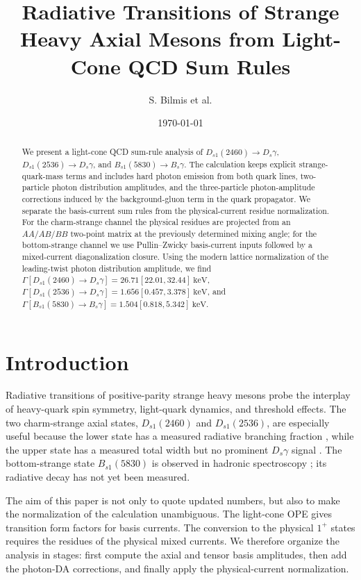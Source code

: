 \documentclass[11pt]{article}
\title{Radiative Transitions of Strange Heavy Axial Mesons from Light-Cone QCD Sum Rules}
\author{S. Bilmis et al.}
\date{\today}
\newcommand{\Ds}{D_s}
\newcommand{\Dsone}{D_{s1}}
\newcommand{\Bs}{B_s}
\newcommand{\Bsone}{B_{s1}}
\newcommand{\keV}{\mathrm{keV}}
\begin{document}
\maketitle

\begin{abstract}
We present a light-cone QCD sum-rule analysis of
$\Dsone(2460)\to\Ds\gamma$, $\Dsone(2536)\to\Ds\gamma$, and
$\Bsone(5830)\to\Bs\gamma$.  The calculation keeps explicit strange-quark-mass
terms and includes hard photon emission from both quark lines, two-particle
photon distribution amplitudes, and the three-particle photon-amplitude
corrections induced by the background-gluon term in the quark propagator.  We
separate the basis-current sum rules from the physical-current residue
normalization.  For the charm-strange channel the physical residues are
projected from an $AA/AB/BB$ two-point matrix at the previously determined
mixing angle; for the bottom-strange channel we use Pullin--Zwicky basis-current
inputs followed by a mixed-current diagonalization closure.  Using the modern
lattice normalization of the
leading-twist photon distribution amplitude, we find
$\Gamma[\Dsone(2460)\to\Ds\gamma]=26.71[22.01,32.44]~\keV$,
$\Gamma[\Dsone(2536)\to\Ds\gamma]=1.656[0.457,3.378]~\keV$, and
$\Gamma[\Bsone(5830)\to\Bs\gamma]=1.504[0.818,5.342]~\keV$.
\end{abstract}

\section{Introduction}

Radiative transitions of positive-parity strange heavy mesons probe the
interplay of heavy-quark spin symmetry, light-quark dynamics, and threshold
effects.  The two charm-strange axial states, $\Dsone(2460)$ and
$\Dsone(2536)$, are especially useful because the lower state has a measured
radiative branching fraction \cite{BaBar2006}, while the upper state has a
measured total width but no prominent $\Ds\gamma$ signal \cite{BaBar2011}.  The
bottom-strange state $\Bsone(5830)$ is observed in hadronic spectroscopy
\cite{CMS2018}; its radiative decay has not yet been measured.

The aim of this paper is not only to quote updated numbers, but also to make the
normalization of the calculation unambiguous.  The light-cone OPE gives
transition form factors for basis currents.  The conversion to the physical
$1^+$ states requires the residues of the physical mixed currents.  We therefore
organize the analysis in stages: first compute the axial and tensor basis
amplitudes, then add the photon-DA corrections, and finally apply the
physical-current normalization.
\end{document}
